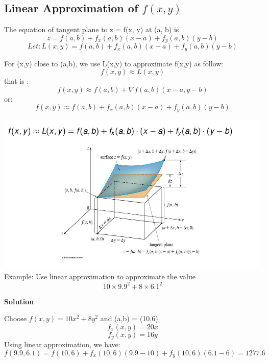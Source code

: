 \documentclass[12pt]{article}
\begin{document}
\subsection{Linear Approximation of $f(x,y)$ }
The equation of tangent plane to z = f(x, y) at (a, b) is
$$z = f(a,b) + f_x(a,b)(x-a)+f_y(a,b)(y-b)$$
$$Let:  L(x,y) = f(a,b) + f_x(a,b)(x-a)+f_y(a,b)(y-b)$$
\begin{mybox}
    For (x,y) close to (a,b), we use L(x,y) to approximate f(x,y) as follow: 
    $$f(x,y) \approx L(x,y)$$
    that is : 
    $$f(x,y) \approx f(a,b) + \nabla f(a,b)(x-a,y-b) $$
    or:
    $$f(x,y) \approx f(a,b) + f_x(a,b)(x-a)+f_y(a,b)(y-b)$$
\end{mybox}
\includegraphics[scale  =0.65]{12.png}\\
Example: Use linear approximation to approximate the value
$$10\times 9.9^2 + 8 \times 6.1^2$$
 \begin{center}
     \textbf{Solution} 
 \end{center}
Choose $f(x,y)=10x^2 +8y^2$ and (a,b) = (10,6) \\
$$f_x(x,y) = 20x$$
$$f_y(x,y) = 16y$$
Using linear approximation, we have:
$$f(9.9,6.1) = f(10,6) + f_x(10,6)(9.9 -10) +f_y(10,6)(6.1-6) = 1277.6$$
\end{document}
